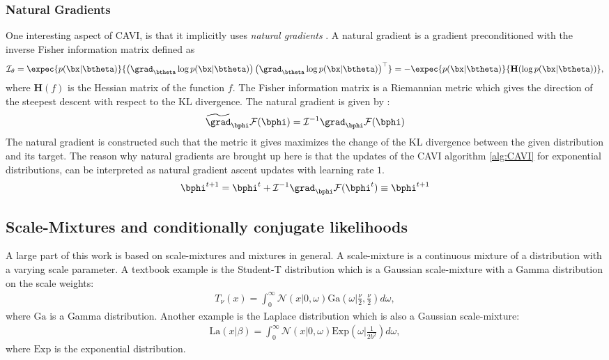 \subsubsection{Natural Gradients}

One interesting aspect of \ac{CAVI}, is that it implicitly uses \textit{natural gradients} \cite{amariNaturalGradientWorks1998}.
A natural gradient is a gradient preconditioned with the inverse Fisher information matrix defined as
\begin{align}
    \mathcal{I}_\theta = \expec{p(\bx|\btheta)}{\left(\grad_{\btheta}\log p(\bx|\btheta)\right)\left(\grad_{\btheta} \log p(\bx|\btheta)\right)^\top} = -\expec{p(\bx|\btheta)}{\mathbf{H}(\log p(\bx|\btheta))},
    \label{eq:fisherinfomatrix}
\end{align}
where $\mathbf{H}(f)$ is the Hessian matrix of the function $f$.
The Fisher information matrix is a Riemannian metric which gives the direction of the steepest descent with respect to the KL divergence.
The natural gradient is given by :
\begin{align*}
    \widetilde{\grad}_{\bphi}\mathcal{F}(\bphi) = \mathcal{I}^{-1} \grad_{\bphi}\mathcal{F}(\bphi)
\end{align*}
The natural gradient is constructed such that the metric it gives maximizes the change of the \ac{KL} divergence between the given distribution and its target.
The reason why natural gradients are brought up here is that the updates of the \ac{CAVI} algorithm \ref{alg:CAVI} for exponential distributions, can be interpreted as natural gradient ascent updates with learning rate $1$.
\begin{align*}
    \bphi^{t+1} = \bphi^t + \mathcal{I}^{-1}\grad_{\bphi}\mathcal{F}(\bphi^t) \equiv \bphi^{t+1}
\end{align*}


\subsection{Scale-Mixtures and conditionally conjugate likelihoods}
\label{sec:scale-mixtures}
A large part of this work is based on scale-mixtures and mixtures in general.
A scale-mixture is a continuous mixture of a distribution with a varying scale parameter.
A textbook example is the Student-T distribution which is a Gaussian scale-mixture with a Gamma distribution on the scale weights:
\begin{align*}
    T_\nu(x) = \int_{0}^\infty \mathcal{N}\left(x|0,\omega\right)\mathrm{Ga}\left(\omega|\frac{\nu}{2}, \frac{\nu}{2}\right)d\omega,
\end{align*}
where $\mathrm{Ga}$ is a Gamma distribution.
Another example is the Laplace distribution which is also a Gaussian scale-mixture:
\begin{align*}
    \mathrm{La}(x|\beta) = \int_0^{\infty} \mathcal{N}(x|0,\omega)\mathrm{Exp}\left(\omega|\frac{1}{2b^2}\right)d\omega,
\end{align*}
where $\mathrm{Exp}$ is the exponential distribution.


